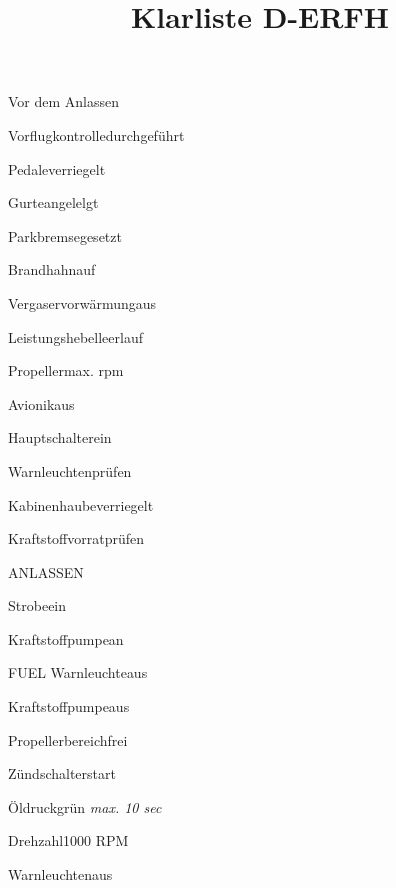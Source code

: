 \def\papersize{4}





\title{Klarliste D-ERFH}

\begin{memoryitem}
  \begin{checklist}{Vor dem Anlassen}
    \item{Vorflugkontrolle}{durchgeführt}
    \item{Pedale}{verriegelt}
    \item{Gurte}{angelelgt}
    \item{Parkbremse}{gesetzt}
    \item{Brandhahn}{auf}
    \item{Vergaservorwärmung}{aus}
    \item{Leistungshebel}{leerlauf}
    \item{Propeller}{max. rpm}
    \item{Avionik}{aus}
    \item{Hauptschalter}{ein}
    \item{Warnleuchten}{prüfen}
    \item{Kabinenhaube}{verriegelt}
    \item{Kraftstoffvorrat}{prüfen}
  \end{checklist}
\end{memoryitem}

\begin{memoryitem}
  \begin{checklist}{ANLASSEN}
    \item{Strobe}{ein}
    \item{Kraftstoffpumpe}{an}
    \item{FUEL Warnleuchte}{aus}
    \item{Kraftstoffpumpe}{aus}
    \item{Propellerbereich}{frei}
    \item{Zündschalter}{start}
    \item{Öldruck}{grün \textit{max. 10 sec}}
    \item{Drehzahl}{1000 RPM}
    \item{Warnleuchten}{aus}
  \end{checklist}
\end{memoryitem}

